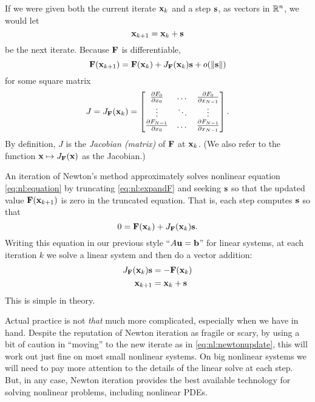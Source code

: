 If we were given both the current iterate $\mathbf{x}_k$ and a step $\mathbf{s}$, as vectors in $\mathbb{R}^n$, we would let
\begin{equation}
\mathbf{x}_{k+1} = \mathbf{x}_k + \mathbf{s} \label{eq:nl:firstupdate}
\end{equation}
be the next iterate.  Because $\mathbf{F}$ is differentiable,
\begin{equation}
    \mathbf{F}(\mathbf{x}_{k+1}) = \mathbf{F}(\mathbf{x}_k) + J_{\mathbf{F}}(\mathbf{x}_k) \mathbf{s} + o(\|\mathbf{s}\|)  \label{eq:nl:expandF}
\end{equation}
for some square matrix
\begin{equation}
J = J_{\mathbf{F}}(\mathbf{x}_k) = \begin{bmatrix}
    \frac{\partial F_0}{\partial x_0} & \dots & \frac{\partial F_0}{\partial x_{N-1}} \\
    \vdots & \ddots & \vdots \\
    \frac{\partial F_{N-1}}{\partial x_0} & \dots & \frac{\partial F_{N-1}}{\partial x_{N-1}}  \end{bmatrix}.  \label{eq:nl:jacdefn}
\end{equation}
By definition, $J$ is the \emph{Jacobian (matrix)} of $\mathbf{F}$ at $\mathbf{x}_k$.  (We also refer to the function $\mathbf{x} \mapsto J_{\mathbf{F}}(\mathbf{x})$ as the Jacobian.)

An iteration of Newton's method approximately solves nonlinear equation \eqref{eq:nl:equation} by truncating \eqref{eq:nl:expandF} and seeking $\mathbf{s}$ so that the updated value $\mathbf{F}(\mathbf{x}_{k+1})$ is zero in the truncated equation.  That is,  each step computes $\mathbf{s}$ so that
\begin{equation}
    0 = \mathbf{F}(\mathbf{x}_k) + J_{\mathbf{F}}(\mathbf{x}_k) \mathbf{s}.
\end{equation}
Writing this equation in our previous style ``$A\mathbf{u}=\mathbf{b}$'' for linear systems, at each iteration $k$ we solve a linear system and then do a vector addition:
\begin{align}
    J_{\mathbf{F}}(\mathbf{x}_k) \mathbf{s} &= - \mathbf{F}(\mathbf{x}_k)  \label{eq:nl:newtoneq}  \\
    \mathbf{x}_{k+1} &= \mathbf{x}_k + \mathbf{s}  \label{eq:nl:newtonupdate}
\end{align}
This is simple in theory.

Actual practice is not \emph{that} much more complicated, especially when we have \PETSc in hand.  Despite the reputation of Newton iteration as fragile or scary, by using a bit of caution in ``moving'' to the new iterate as in \eqref{eq:nl:newtonupdate}, this will work out just fine on most small nonlinear systems.  On big nonlinear systems we will need to pay more attention to the details of the linear solve at each step.  But, in any case, Newton iteration provides the best available technology for solving nonlinear problems, including nonlinear PDEs.

